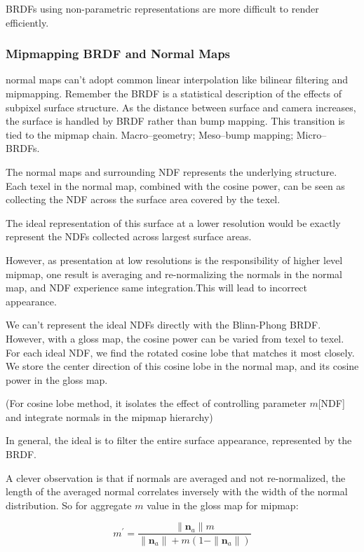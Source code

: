 \documentclass[10pt, a4paper]{article}
\begin{document}
            BRDFs using non-parametric representations are more difficult to render efficiently. 

        \subsubsection{Mipmapping BRDF and Normal Maps}
            normal maps can't adopt common linear interpolation like bilinear filtering and mipmapping. Remember the BRDF is a statistical description of the effects of subpixel surface structure. As the distance between surface and camera increases, the surface is handled by BRDF rather than bump mapping. This transition is tied to the mipmap chain. Macro--geometry; Meso--bump mapping; Micro--BRDFs. 

            The normal maps and surrounding NDF represents the underlying structure. Each texel in the normal map, combined with the cosine power, can be seen as collecting the NDF across the surface area covered by the texel. 

            The ideal representation of this surface at a lower resolution would be exactly represent the NDFs collected across largest surface areas.
            
            However, as presentation at low resolutions is the responsibility of higher level mipmap, one result is averaging and re-normalizing the normals in the normal map, and NDF experience same integration.This will lead to incorrect appearance.
            
            We can't represent the ideal NDFs directly with the Blinn-Phong BRDF. However, with a gloss map, the cosine power can be varied from texel to texel. For each ideal NDF, we find the rotated cosine lobe that matches it most closely. We store the center direction of this cosine lobe in the normal map, and its cosine power in the gloss map.  

            (For cosine lobe method, it isolates the effect of controlling parameter $m$[NDF] and integrate normals in the mipmap hierarchy)

            In general, the ideal is to filter the entire surface appearance, represented by the BRDF. 

            A clever observation is that  if normals are averaged and not re-normalized, the length of the averaged normal correlates inversely with the width of the normal distribution. So for aggregate $m$ value in the gloss map for mipmap: 

            $$m^{'} = \frac{\|\textbf{n}_a\|m}{\|\textbf{n}_a\| + m(1 - \|\textbf{n}_a\|)}$$
\end{document}
